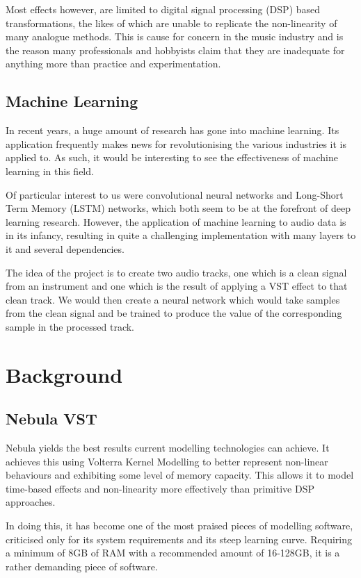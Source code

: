 \documentclass{l4proj}
\begin{document}
Most effects however, are limited to digital signal processing (DSP)
based transformations, the likes of which are unable to replicate the
non-linearity of many analogue methods. This is cause for concern in the
music industry and is the reason many professionals and hobbyists claim
that they are inadequate for anything more than practice and
experimentation.

\section{Machine Learning}\label{machine-learning}

In recent years, a huge amount of research has gone into machine
learning. Its application frequently makes news for revolutionising the
various industries it is applied to. As such, it would be interesting to
see the effectiveness of machine learning in this field.

Of particular interest to us were convolutional neural networks and
Long-Short Term Memory (LSTM) networks, which both seem to be at the
forefront of deep learning research. However, the application of machine
learning to audio data is in its infancy, resulting in quite a
challenging implementation with many layers to it and several
dependencies.

The idea of the project is to create two audio tracks, one which is a
clean signal from an instrument and one which is the result of applying
a VST effect to that clean track. We would then create a neural network
which would take samples from the clean signal and be trained to produce
the value of the corresponding sample in the processed track.

\chapter{Background}\label{background}

\section{Nebula VST}\label{nebula-vst}

Nebula yields the best results current modelling technologies can
achieve. It achieves this using Volterra Kernel Modelling to better
represent non-linear behaviours and exhibiting some level of memory
capacity. This allows it to model time-based effects and non-linearity
more effectively than primitive DSP approaches.

In doing this, it has become one of the most praised pieces of modelling
software, criticised only for its system requirements and its steep
learning curve. Requiring a minimum of 8GB of RAM with a recommended
amount of 16-128GB, it is a rather demanding piece of software.
\end{document}
